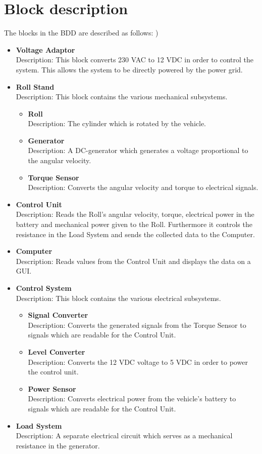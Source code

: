 \section{Block description}
The blocks in the BDD are described as follows:
)
\begin{itemize}
	\item \textbf{Voltage Adaptor}\\
	Description: This block converts 230 VAC to 12 VDC in order to control the system. This allows the system to be directly powered by the power grid.
	\item \textbf{Roll Stand}\\
	Description: This block contains the various mechanical subsystems.
	\begin{itemize}
		\item \textbf{Roll}\\
		Description: The cylinder which is rotated by the vehicle.
		\item \textbf{Generator}\\
		Description: A DC-generator which generates a voltage proportional to the angular velocity.
		\item \textbf{Torque Sensor}\\
		Description: Converts the angular velocity and torque to electrical signals.
	\end{itemize}
	\item \textbf{Control Unit}\\
	Description: Reads the Roll's angular velocity, torque, electrical power in the battery and mechanical power given to the Roll. Furthermore it controls the resistance in the Load System and sends the collected data to the Computer.
	\item \textbf{Computer}\\
	Description: Reads values from the Control Unit and displays the data on a GUI.
	\item \textbf{Control System}\\
	Description: This block contains the various electrical subsystems.
	\begin{itemize}
		\item \textbf{Signal Converter}\\
		Description: Converts the generated signals from the Torque Sensor to signals which are readable for the Control Unit.
		\item \textbf{Level Converter}\\
		Description: Converts the 12 VDC voltage to 5 VDC in order to power the control unit.
		\item \textbf{Power Sensor}\\
		Description: Converts electrical power from the vehicle's battery to signals which are readable for the Control Unit.
	\end{itemize}
	\item \textbf{Load System}\\
	Description: A separate electrical circuit which serves as a mechanical resistance in the generator.
\end{itemize}